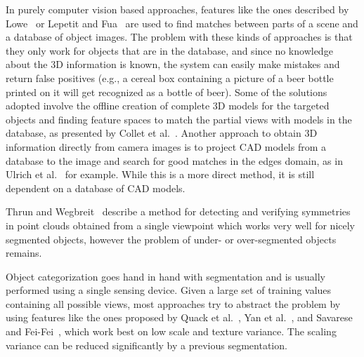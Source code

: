 In purely computer vision based approaches, features like the ones described by
Lowe~\cite{lowe04distinctive} or Lepetit and Fua~\cite{lepetit06keypoint} are
used to find matches between parts of a scene and a database of object images.
The problem with these kinds of approaches
is that they only work for objects that are in the database, and since no
knowledge about the 3D information is known, the system can easily make
mistakes and return false positives (e.g., a cereal box containing a picture
of a beer bottle printed on it will get recognized as a bottle of beer).
Some of the solutions adopted involve the offline creation of complete 3D models
for the targeted objects and finding feature spaces to match the partial views
with models in the database, as presented by Collet et al.~\cite{Collet09ICRA}.
Another approach to obtain 3D information directly from camera images is to
project CAD models from a database to the image and search for good matches in
the edges domain, as in Ulrich et al.~\cite{ulrich-etal:09} for example. While
this is a more direct method, it is still dependent on a database of CAD models.


Thrun and Wegbreit~\cite{Thrun05Symmetries} describe a method for detecting and verifying
symmetries in point clouds obtained from a single viewpoint which works very well for
nicely segmented objects, however the problem of under- or over-segmented objects remains.

Object categorization goes hand in hand with segmentation and is usually
performed using a single sensing device.  Given a large set of training
values containing all possible views, most approaches try to abstract the
problem by using features like the ones proposed by Quack et al.~\cite{quack2007emf},
Yan et al.~\cite{yan2007mbo}, and Savarese and Fei-Fei~\cite{savarese2007goc},
which work best on low scale and texture variance.  The
scaling variance can be reduced significantly by a previous segmentation.

